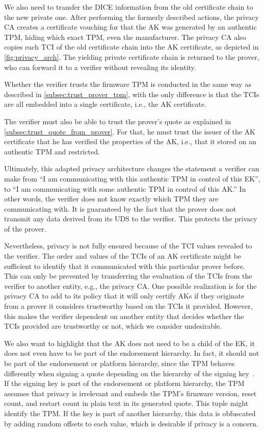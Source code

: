 

We also need to transfer the DICE information from the old certificate chain to the new private one.
After performing the formerly described actions, the privacy CA creates a certificate vouching for that the AK was generated by an authentic TPM, hiding which exact TPM, even the manufacturer.
The privacy CA also copies each TCI of the old certificate chain into the AK certificate, as depicted in \autoref{fig:privacy_arch}.
The yielding private certificate chain is returned to the prover, who can forward it to a verifier without revealing its identity.

Whether the verifier trusts the firmware TPM is conducted in the same way as described in \autoref{subsec:trust_prover_tpm}, with the only difference is that the TCIs are all embedded into a single certificate, i.e., the AK certificate.

The verifier must also be able to trust the prover's quote as explained in \autoref{subsec:trust_quote_from_prover}.
For that, he must trust the issuer of the AK certificate that he has verified the properties of the AK, i.e., that it stored on an authentic TPM and restricted.

Ultimately, this adapted privacy architecture changes the statement a verifier can make from ``I am communicating with this authentic TPM in control of this EK'', to ``I am communicating with some authentic TPM in control of this AK.''
In other words, the verifier does not know exactly which TPM they are communicating with.
It is guaranteed by the fact that the prover does not transmit any data derived from its UDS to the verifier.
This protects the privacy of the prover.

Nevertheless, privacy is not fully ensured because of the TCI values revealed to the verifier.
The order and values of the TCIs of an AK certificate might be sufficient to identify that it communicated with this particular prover before.
This can only be prevented by transferring the evaluation of the TCIs from the verifier to another entity, e.g., the privacy CA\@.
One possible realization is for the privacy CA to add to its policy that it will only certify AKs if they originate from a prover it considers trustworthy based on the TCIs it provided.
However, this makes the verifier dependent on another entity that decides whether the TCIs provided are trustworthy or not, which we consider undesirable.

We also want to highlight that the AK does not need to be a child of the EK, it does not even have to be part of the endorsement hierarchy.
In fact, it should not be part of the endorsement or platform hierarchy, since the TPM behaves differently when signing a quote depending on the hierarchy of the signing key~\cite{tpm}.
If the signing key is part of the endorsement or platform hierarchy, the TPM assumes that privacy is irrelevant and embeds the TPM's firmware version, reset count, and restart count in plain text in its generated quote.
This tuple might identify the TPM\@.
If the key is part of another hierarchy, this data is obfuscated by adding random offsets to each value, which is desirable if privacy is a concern.

